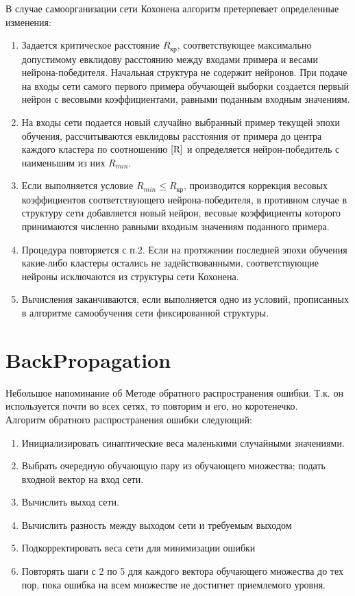 \documentclass[paper=a4, fontsize=11pt]{scrartcl} %
\numberwithin{equation}{section} %
\numberwithin{figure}{section} %
\numberwithin{table}{section} %
\begin{document}
	В случае самоорганизации сети Кохонена алгоритм претерпевает определенные изменения:
	
	\begin{enumerate}
		\item Задается критическое расстояние $R_{кр}$, соответствующее максимально допустимому евклидову расстоянию между входами примера и весами нейрона-победителя. Начальная структура не содержит нейронов. При подаче на входы сети самого первого примера обучающей выборки создается первый нейрон с весовыми коэффициентами, равными поданным входным значениям.
		\item На входы сети подается новый случайно выбранный пример текущей эпохи обучения, рассчитываются евклидовы расстояния от примера до центра каждого кластера по соотношению $\ref{R}$ и определяется нейрон-победитель с наименьшим из них $R_{min}$.
		\item Если выполняется условие $R_{min} \le R_{кр}$, производится коррекция весовых коэффициентов соответствующего нейрона-победителя, в противном случае в структуру сети добавляется новый нейрон, весовые коэффициенты которого принимаются численно равными входным значениям поданного примера.
		\item Процедура повторяется с п.2. Если на протяжении последней эпохи обучения какие-либо кластеры остались не задействованными, соответствующие нейроны исключаются из структуры сети Кохонена.
		\item Вычисления заканчиваются, если выполняется одно из условий, прописанных в алгоритме самообучения сети фиксированной структуры.
	\end{enumerate}


	\section{BackPropagation }
	Небольшое напоминание об Методе обратного распространения ошибки. Т.к. он используется почти во всех сетях, то повторим и его, но коротенечко. \\
	Алгоритм обратного распространения ошибки следующий:
	
	\begin{enumerate}
		\item Инициализировать синаптические веса маленькими случайными значениями.
		\item Выбрать очередную обучающую пару из обучающего множества; подать входной вектор на вход сети.
		\item Вычислить выход сети.
		\item Вычислить разность между выходом сети и требуемым выходом 
		\item Подкорректировать веса сети для минимизации ошибки 
		\item Повторять шаги с 2 по 5 для каждого вектора обучающего множества до тех пор, пока ошибка на всем множестве не достигнет приемлемого уровня.
	\end{enumerate}
\end{document}
